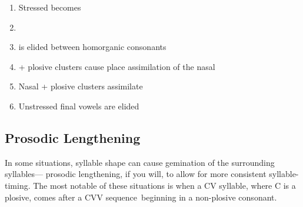 \begin{enumerate}
  \item {
    Stressed  becomes 

    }
  \item {}
  \item {
     is elided between homorganic consonants

    }
    \item {
       + plosive clusters cause place assimilation of the nasal

  }
    \item {
      Nasal + plosive clusters assimilate

  }

  \item {
      Unstressed final vowels are elided

  }


\end{enumerate}

\subsection{Prosodic Lengthening}\label{sec:allophony-lengthening}
In some situations, syllable shape can cause gemination of the surrounding syllables--- prosodic lengthening, if you will, to allow for more consistent syllable-timing. The most notable of these situations is when a CV syllable, where C is a plosive, comes after a CVV sequence\footnotemark\ beginning in a non-plosive consonant.


